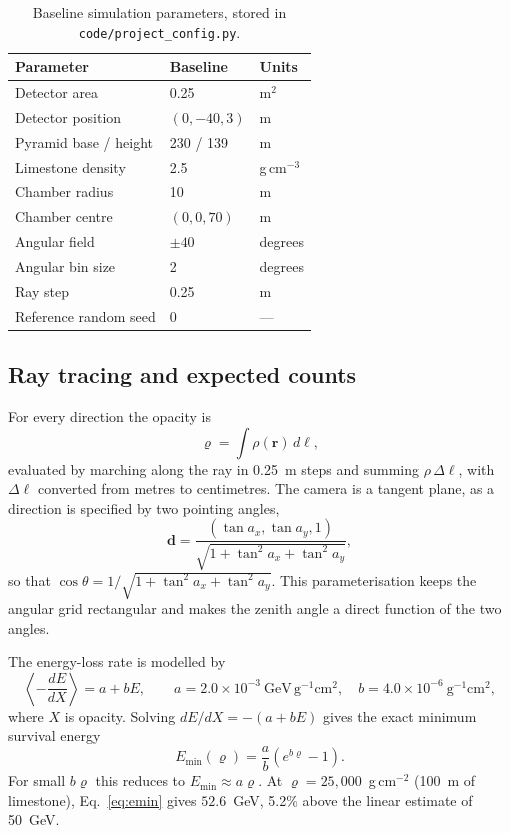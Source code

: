 \documentclass{article}
\begin{document}
\begin{table}[t]
\centering
\caption{Baseline simulation parameters, stored in
\texttt{code/project\_config.py}.}
\label{tab:params}
\small
\begin{tabular}{@{}lll@{}}
\toprule
Parameter & Baseline & Units \\
\midrule
Detector area & 0.25 & m$^2$ \\
Detector position & $(0,-40,3)$ & m \\
Pyramid base / height & 230 / 139 & m \\
Limestone density & 2.5 & g\,cm$^{-3}$ \\
Chamber radius & 10 & m \\
Chamber centre & $(0,0,70)$ & m \\
Angular field & $\pm40$ & degrees \\
Angular bin size & 2 & degrees \\
Ray step & 0.25 & m \\
Reference random seed & 0 & --- \\
\bottomrule
\end{tabular}
\end{table}


\subsection{Ray tracing and expected counts}

For every direction the opacity is
\begin{equation}
\varrho=\int \rho(\mathbf{r})\,d\ell,
\label{eq:opacity}
\end{equation}
evaluated by marching along the ray in 0.25~m steps and summing
$\rho\,\Delta\ell$, with $\Delta\ell$ converted from metres to centimetres. The
camera is a tangent plane, as a direction is specified by two pointing angles,
\begin{equation}
\mathbf{d}=\frac{(\tan a_x,\tan a_y,1)}
{\sqrt{1+\tan^2a_x+\tan^2a_y}},
\label{eq:direction}
\end{equation}
so that $\cos\theta=1/\sqrt{1+\tan^2a_x+\tan^2a_y}$. This parameterisation
keeps the angular grid rectangular and makes the zenith angle a direct
function of the two angles.

The energy-loss rate is modelled by
\begin{equation}
\left\langle-\frac{dE}{dX}\right\rangle=a+bE,
\qquad
a=2.0\times10^{-3}~\mathrm{GeV\,g^{-1}cm^2},\quad
b=4.0\times10^{-6}~\mathrm{g^{-1}cm^2},
\label{eq:loss}
\end{equation}
where $X$ is opacity. Solving $dE/dX=-(a+bE)$ gives the exact minimum
survival energy
\begin{equation}
E_{\min}(\varrho)=\frac{a}{b}\left(e^{b\varrho}-1\right).
\label{eq:emin}
\end{equation}
For small $b\varrho$ this reduces to $E_{\min}\approx a\varrho$. At
$\varrho=25{,}000$~g\,cm$^{-2}$ (100~m of limestone), Eq.~\eqref{eq:emin}
gives $52.6$~GeV, 5.2\% above the linear estimate of 50~GeV.
\end{document}
